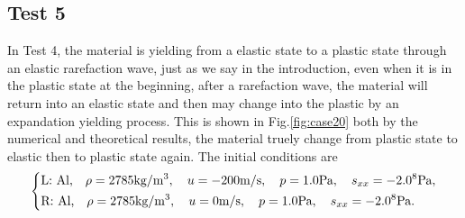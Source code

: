 \documentclass{article}
\numberwithin{equation}{section}
\numberwithin{table}{section}
\begin{document}
\subsection{Test 5}
In Test 4, the material is  yielding from a elastic state to a plastic state through  an elastic rarefaction wave, just as we say in the introduction, 
even when it is in the plastic state at the beginning, after a rarefaction wave, the material will return into an elastic state and then may change into the  plastic by an  expandation yielding process. This is shown in Fig.\ref{fig:case20} both by the numerical and theoretical results, the material truely change from plastic state to elastic then to plastic state again. The initial conditions are 
\begin{equation}
 \left\{ \begin{aligned}
	 &	 \text{L: Al,}\quad  \rho = 2785 \text{kg}/\text{m}^3, \quad  u = -200\text{m}/\text{s}, \quad  p = 1.0 \text{Pa}, \quad  s_{xx}=-2.0\time 10^8 \text{Pa},\\
	 &	 \text{R: Al,}\quad  \rho = 2785 \text{kg}/\text{m}^3, \quad  u = 0\text{m}/\text{s}, \quad  p = 1.0\text{Pa}, \quad  s_{xx}= -2.0 \time 10^8 \text{Pa}.\\
   \end{aligned}
 \right.
\end{equation}
\end{document}
